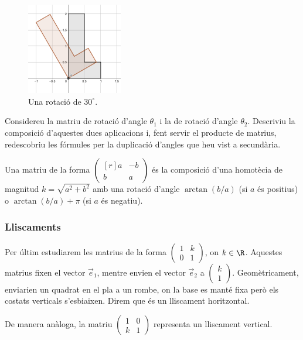\begin{figure}[ht]
    \centering
    \includegraphics[height=4cm]{rotacio.png}
    \caption{Una rotació de $30^\circ$.}
    \label{fig:rotacio}
\end{figure}
\begin{exercici}
	Considereu la matriu de rotació d'angle $\theta_1$ i la de rotació d'angle $\theta_2$. Descriviu la composició d'aquestes dues aplicacions i, fent servir el producte de matrius, redescobriu les fórmules per la duplicació d'angles que heu vist a secundària.
\end{exercici}

\begin{proposicio}
	Una matriu de la forma $\begin{pmatrix*}[r]a&-b\\b&a\end{pmatrix*}$ és la composició d'una homotècia de magnitud $k=\sqrt{a^2+b^2}$ amb una rotació d'angle $\arctan(b/a)$ (si $a$ és positius) o $\arctan(b/a) + \pi$ (si $a$ és negatiu).
\end{proposicio}

\subsubsection{Lliscaments}
Per últim estudiarem les matrius de la forma $\begin{pmatrix} 1&k\\0&1\end{pmatrix}$, on $k\in \R$. Aquestes matrius fixen el vector $\vec e_1$, mentre envien el vector $\vec e_2$ a $\begin{pmatrix}k\\1\end{pmatrix}$. Geomètricament, enviarien un quadrat en el pla a un rombe, on la base es manté fixa però els costats verticals s'esbiaixen. Direm que és un lliscament horitzontal.

De manera anàloga, la matriu $\begin{pmatrix}1&0\\k&1\end{pmatrix}$ representa un lliscament vertical.

